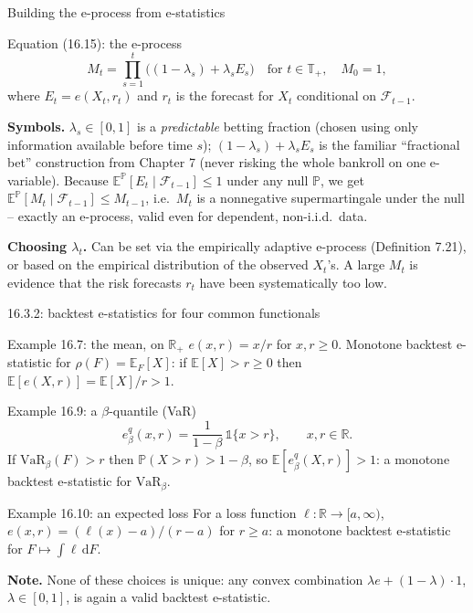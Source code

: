 \documentclass[aspectratio=169,10pt]{beamer}
\newcommand{\PP}{\mathbb{P}}
\newcommand{\EE}{\mathbb{E}}
\newcommand{\RR}{\mathbb{R}}
\newcommand{\1}{\mathbb{1}}
\begin{document}
\begin{frame}{Building the e-process from e-statistics}

\begin{block}{Equation (16.15): the e-process}
\[
M_t = \prod_{s=1}^t \bigl( (1-\lambda_s) + \lambda_s E_s \bigr) \quad \text{for } t \in \mathbb T_+, \quad M_0 = 1,
\]
where $E_t = e(X_t, r_t)$ and $r_t$ is the forecast for $X_t$ conditional on $\mathcal F_{t-1}$.
\end{block}

\textbf{Symbols.} $\lambda_s \in [0,1]$ is a \emph{predictable} betting fraction (chosen using only information available before time $s$); $(1-\lambda_s)+\lambda_s E_s$ is the familiar ``fractional bet'' construction from Chapter 7 (never risking the whole bankroll on one e-variable). Because $\EE^{\PP}[E_t \mid \mathcal F_{t-1}] \le 1$ under any null $\PP$, we get $\EE^{\PP}[M_t \mid \mathcal F_{t-1}] \le M_{t-1}$, i.e.\ $M_t$ is a nonnegative supermartingale under the null -- exactly an e-process, valid even for dependent, non-i.i.d.\ data.

\vspace{2mm}
\textbf{Choosing $\lambda_t$.} Can be set via the empirically adaptive e-process (Definition 7.21), or based on the empirical distribution of the observed $X_t$'s. A large $M_t$ is evidence that the risk forecasts $r_t$ have been systematically too low.

\end{frame}

\begin{frame}{16.3.2: backtest e-statistics for four common functionals}

\begin{block}{Example 16.7: the mean, on $\RR_+$}
$e(x,r) = x/r$ for $x,r \ge 0$. Monotone backtest e-statistic for $\rho(F)=\EE_F[X]$: if $\EE[X] > r \ge 0$ then $\EE[e(X,r)] = \EE[X]/r > 1$.
\end{block}

\begin{block}{Example 16.9: a $\beta$-quantile (VaR)}
\[
e^q_\beta(x,r) = \frac{1}{1-\beta}\,\1\{x>r\}, \qquad x,r \in \RR.
\]
If $\mathrm{VaR}_\beta(F) > r$ then $\PP(X>r) > 1-\beta$, so $\EE[e^q_\beta(X,r)] > 1$: a monotone backtest e-statistic for $\mathrm{VaR}_\beta$.
\end{block}

\begin{block}{Example 16.10: an expected loss}
For a loss function $\ell: \RR \to [a,\infty)$, $e(x,r) = (\ell(x)-a)/(r-a)$ for $r \ge a$: a monotone backtest e-statistic for $F \mapsto \int \ell\, \mathrm dF$.
\end{block}

\textbf{Note.} None of these choices is unique: any convex combination $\lambda e + (1-\lambda)\cdot 1$, $\lambda \in [0,1]$, is again a valid backtest e-statistic.

\end{frame}
\end{document}
